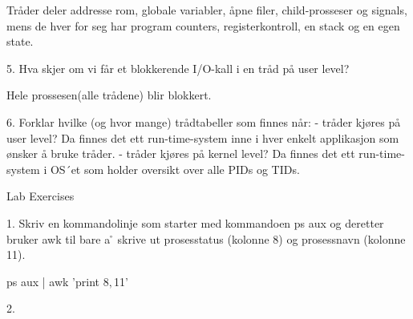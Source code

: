 Tråder deler addresse rom, globale variabler, åpne filer, child-prosseser og signals, mens de hver for seg har program counters, registerkontroll, en stack og en egen state.

5. Hva skjer om vi får et blokkerende I/O-kall i en tråd på user level?

Hele prossesen(alle trådene) blir blokkert.

6. Forklar hvilke (og hvor mange) trådtabeller som finnes når:
 - tråder kjøres på user level?
 Da finnes det ett run-time-system inne i hver enkelt applikasjon som ønsker å bruke tråder.
 - tråder kjøres på kernel level?
 Da finnes det ett run-time-system i OS´et som holder oversikt over alle PIDs og TIDs.

Lab Exercises

1. Skriv en kommandolinje som starter med kommandoen ps aux og deretter bruker awk til bare a ̊ skrive ut prosesstatus (kolonne 8) og prosessnavn (kolonne 11).

ps aux | awk '{print $8, $11}'

2. 
